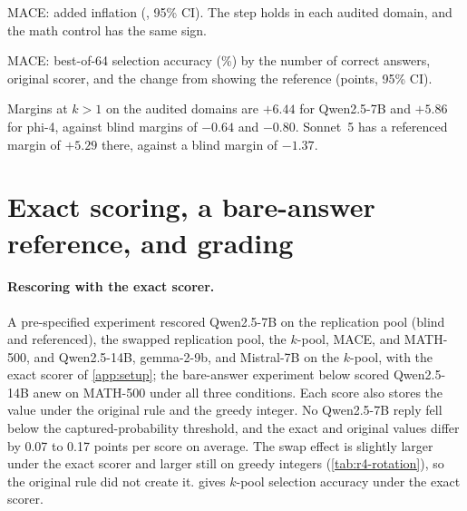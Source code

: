 \begin{table}[htbp]
\centering
\caption{\textsc{MACE}: added inflation (\sd, 95\% CI). The step holds in each audited domain, and the math control has the same sign.\pre}
\label{tab:mace}
\footnotesize
\begin{adjustbox}{max width=\linewidth}\end{adjustbox}

\end{table}

\begin{table}[htbp]
\centering
\caption{\textsc{MACE}: best-of-64 selection accuracy (\%) by the number of correct answers, original scorer, and the change from showing the reference (points, 95\% CI).\ph}
\label{tab:mace-by-k}
\footnotesize
\begin{adjustbox}{max width=\linewidth}\end{adjustbox}

\end{table}

Margins at $k{>}1$ on the audited domains are $+6.44$ for Qwen2.5-7B and $+5.86$ for phi-4, against blind margins of $-0.64$ and $-0.80$. Sonnet~5 has a referenced margin of $+5.29$ there, against a blind margin of $-1.37$.

\FloatBarrier
\section{Exact scoring, a bare-answer reference, and grading}
\label{app:estimator}

\paragraph{Rescoring with the exact scorer.}
A pre-specified experiment rescored Qwen2.5-7B on the replication pool (blind and referenced), the swapped replication pool, the $k$-pool, \textsc{MACE}, and MATH-500, and Qwen2.5-14B, gemma-2-9b, and Mistral-7B on the $k$-pool, with the exact scorer of \cref{app:setup}; the bare-answer experiment below scored Qwen2.5-14B anew on MATH-500 under all three conditions. Each score also stores the value under the original rule and the greedy integer. No Qwen2.5-7B reply fell below the captured-probability threshold, and the exact and original values differ by 0.07 to 0.17 points per score on average. The swap effect is slightly larger under the exact scorer and larger still on greedy integers (\cref{tab:r4-rotation}), so the original rule did not create it.  gives $k$-pool selection accuracy under the exact scorer.\pre

